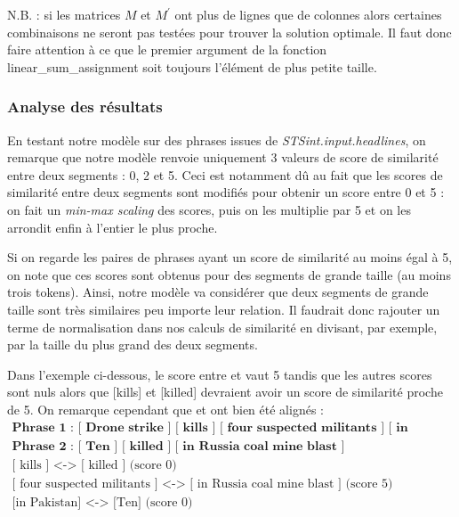\documentclass[a4paper, twoside, 11pt]{article}
\begin{document}
N.B. : si les matrices $M$ et $M^{\prime}$ ont plus de lignes que de colonnes alors certaines combinaisons ne seront pas testées pour trouver la solution optimale.
Il faut donc faire attention à ce que le premier argument de la fonction \og linear\_sum\_assignment \fg{} soit toujours l’élément de plus petite taille.

 \subsubsection{Analyse des résultats}

 En testant notre modèle sur des phrases issues de \textit{STSint.input.headlines}, on remarque que notre modèle renvoie uniquement 3 valeurs de score de similarité entre deux segments : 0, 2 et 5. Ceci est notamment dû au fait que les scores de similarité entre deux segments sont modifiés pour obtenir un score entre 0 et 5 : on fait un \textit{min-max scaling} des scores, puis on les multiplie par 5 et on les arrondit enfin à l'entier le plus proche.

 Si on regarde les paires de phrases ayant un score de similarité au moins égal à 5, on note que ces scores sont obtenus pour des segments de grande taille (au moins trois tokens). Ainsi, notre modèle va considérer que deux segments de grande taille sont très similaires peu importe leur relation. Il faudrait donc rajouter un terme de normalisation dans nos calculs de similarité en divisant, par exemple, par la taille du plus grand des deux segments.

Dans l'exemple ci-dessous, le score entre  \fg{} et   \fg{} vaut 5 tandis que les autres scores sont nuls alors que [kills] et [killed] devraient avoir un score de similarité proche de 5. On remarque cependant que \og [ kills ] \fg{} et \og [ killed ] \fg{} ont bien été alignés :
\begin{eqnarray*}
\textbf{Phrase 1 : [ Drone strike ] [ kills ] [ four suspected militants ] [ in Pakistan ]}\\
\textbf{Phrase 2 : [ Ten ] [ killed ] [ in Russia coal mine blast ]}\\
\textrm{[ kills ] <-> [ killed ] (score 0)}\\
\textrm{[ four suspected militants ] <-> [ in Russia coal mine blast ] (score 5)}\\
\textrm{[in Pakistan] <-> [Ten] (score 0)}
\end{eqnarray*}
\end{document}
